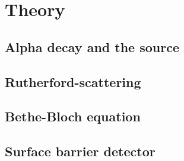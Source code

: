 \section{Theory}
\label{sec:Theorie}

\subsection{Alpha decay and the \texorpdfstring{}{241Am} source}

\subsection{Rutherford-scattering}

\subsection{Bethe-Bloch equation}

\subsection{Surface barrier detector}


\clearpage